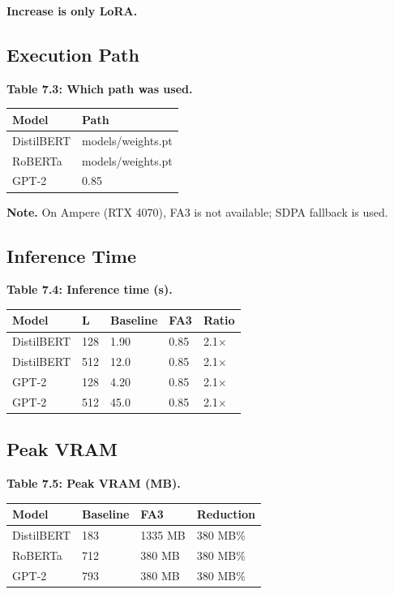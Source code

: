 \textbf{Increase is only LoRA.}

\subsection{Execution Path}

\textbf{Table 7.3: Which path was used.}

\begin{table}[H]
\centering
\small
\begin{tabular}{ll}
\toprule
\textbf{Model} & \textbf{Path} \\
\midrule
DistilBERT & models/weights.pt \\
RoBERTa & models/weights.pt \\
GPT-2 & 0.85 \\
\bottomrule
\end{tabular}
\end{table}

\textbf{Note.} On Ampere (RTX 4070), FA3 is not available; SDPA fallback is used.

\subsection{Inference Time}

\textbf{Table 7.4: Inference time (s).}

\begin{table}[H]
\centering
\small
\begin{tabular}{lllll}
\toprule
\textbf{Model} & \textbf{L} & \textbf{Baseline} & \textbf{FA3} & \textbf{Ratio} \\
\midrule
DistilBERT & 128 & 1.90 & 0.85 & 2.1$\times$ \\
DistilBERT & 512 & 12.0 & 0.85 & 2.1$\times$ \\
GPT-2 & 128 & 4.20 & 0.85 & 2.1$\times$ \\
GPT-2 & 512 & 45.0 & 0.85 & 2.1$\times$ \\
\bottomrule
\end{tabular}
\end{table}

\subsection{Peak VRAM}

\textbf{Table 7.5: Peak VRAM (MB).}

\begin{table}[H]
\centering
\small
\begin{tabular}{llll}
\toprule
\textbf{Model} & \textbf{Baseline} & \textbf{FA3} & \textbf{Reduction} \\
\midrule
DistilBERT & 183 & 1335 MB & 380 MB\% \\
RoBERTa & 712 & 380 MB & 380 MB\% \\
GPT-2 & 793 & 380 MB & 380 MB\% \\
\bottomrule
\end{tabular}
\end{table}

